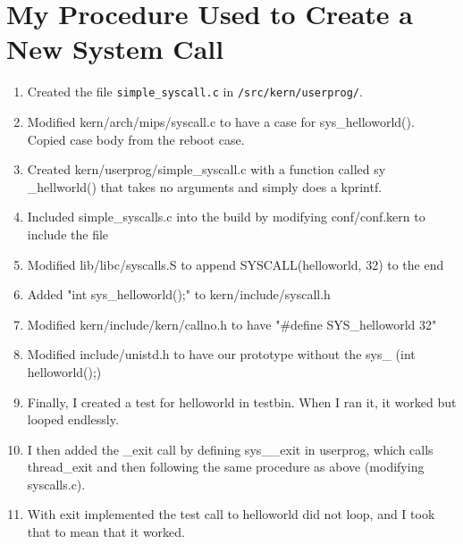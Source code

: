 \documentclass{article}
\begin{document}
\section{My Procedure Used to Create a New System Call}
\begin{enumerate}
\item 
Created the file \texttt{simple\_syscall.c} in \texttt{/src/kern/userprog/}.
\item Modified kern/arch/mips/syscall.c to have a
case for sys\_helloworld(). Copied case body from
the reboot case.

\item Created kern/userprog/simple\_syscall.c with
a function called sy \_hellworld() that takes no
arguments and simply does a kprintf.

\item Included simple\_syscalls.c into the build by
modifying conf/conf.kern to include the file

\item Modified lib/libc/syscalls.S to append
SYSCALL(helloworld, 32) to the end

\item Added "int sys\_helloworld();" to
kern/include/syscall.h

\item Modified kern/include/kern/callno.h to have "\#define SYS\_helloworld 32"

\item Modified include/unistd.h to have our
prototype without the sys\_ (int helloworld();)

\item Finally, I created a test for helloworld in
testbin. When I ran it, it worked but looped
endlessly. 

\item I then added the \_exit call by defining
sys\_\_exit in userprog, which calls thread\_exit
and then following the same procedure as above
(modifying syscalls.c). 

\item With exit implemented the test call to
helloworld did not loop, and I took that to mean
that it worked.

\end{enumerate}
\end{document}
